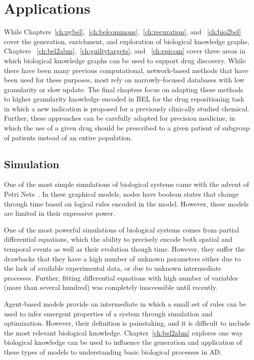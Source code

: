 \section{Applications}
\label{sec:introduction_applications}

While Chapters~\autoref{ch:pybel},~\autoref{ch:belcommons},~\autoref{ch:recuration}, and ~\autoref{ch:bio2bel} cover the generation, enrichment, and exploration of biological knowledge graphs, Chapters ~\autoref{ch:bel2abm},~\autoref{ch:guiltytargets}, and ~\autoref{ch:epicom} cover three areas in which biological knowledge graphs can be used to support drug discovery.
While there have been many previous computational, network-based methods that have been used for these purposes, most rely on narrowly-focused databases with low granularity or slow update.
The final chapters focus on adapting these methods to higher granularity knowledge encoded in BEL for the drug repositioning task in which a new indication is proposed for a previously clinically studied chemical.
Further, these approaches can be carefully adapted for precision medicine, in which the use of a given drug should be prescribed to a given patient of subgroup of patients instead of an entire population.

\subsection{Simulation}

One of the most simple simulations of biological systems came with the advent of Petri Nets~\cite{Peterson1977}.
In these graphical models, nodes have boolean states that change through time based on logical rules encoded in the model.
However, these models are limited in their expressive power.

One of the most powerful simulations of biological systems comes from partial differential equations, which the ability to precisely encode both spatial and temporal events as well as their evolution though time.
However, they suffer the drawbacks that they have a high number of unknown parameters either due to the lack of available experimental data, or due to unknown intermediate processes.
Further, fitting differential equations with high number of variables (more than several hundred) was completely inaccessible until recently.

Agent-based models provide an intermediate in which a small set of rules can be used to infer emergent properties of a system through simulation and optimization.
However, their definition is painstaking, and it is difficult to include the most relevant biological knowledge.
Chapter~\autoref{ch:bel2abm} explores one way biological knowledge can be used to influence the generation and application of these types of models to understanding basic biological processes in \ac{AD}.

